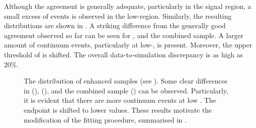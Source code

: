 Although the agreement is generally adequate, particularly in the signal region, a small excess of events is observed in the low-\EB region.
Similarly, the resulting \Mbc distributions are shown in .
A striking difference from the generally good agreement observed so far can be seen for \feiBp, \feiBz and the combined sample.
A larger amount of continuum events, particularly at low-\Mbc, is present.
Moreover, the upper threshold of \Mbc is shifted.
The overall data-to-simulation discrepancy is as high as 20\%.
\begin{figure}[hbtp!]
    \centering
    \caption{\label{fig:qqbar_enhanced_mbc}
    The \Mbc distribution of \qqbar enhanced samples (see ).
    Some clear differences in \feiBp (), \feiBz (),
    and the combined sample () can be observed.
    Particularly, it is evident that there are more continuum events at low \Mbc.
    The \Mbc endpoint is shifted to lower values.
    These results motivate the modification of the \Mbc fitting procedure, 
    summarised in .
    }
\end{figure}


